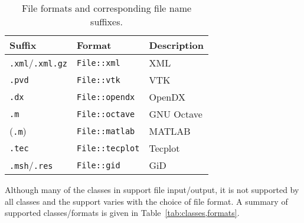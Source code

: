 \begin{table}[htbp]
  \begin{center}
    \begin{tabular}{|l|l|l|}
      \hline
      Suffix & Format & Description \\
      \hline
      \hline
      \texttt{.xml}/\texttt{.xml.gz} & \texttt{File::xml} & \dolfin{} XML \\
      \hline
      \texttt{.pvd} & \texttt{File::vtk} & VTK \\
      \hline
      \texttt{.dx} & \texttt{File::opendx} & OpenDX \\
      \hline
      \texttt{.m} & \texttt{File::octave} & GNU Octave \\
      \hline
      (\texttt{.m}) & \texttt{File::matlab} & MATLAB \\
      \hline
      \texttt{.tec} & \texttt{File::tecplot} & Tecplot \\
      \hline
      \texttt{.msh}/\texttt{.res} & \texttt{File::gid} & GiD \\
      \hline
    \end{tabular}
    \caption{File formats and corresponding file name suffixes.}
    \label{tab:formats}
  \end{center}
\end{table}

Although many of the classes in \dolfin{} support file input/output,
it is not supported by all classes and the support varies with the
choice of file format. A summary of supported classes/formats is
given in Table~\ref{tab:classes,formats}.


